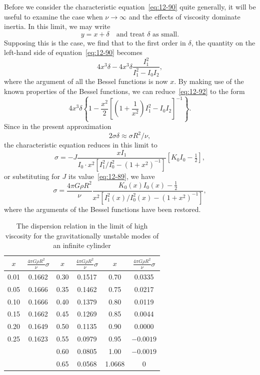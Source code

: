 Before we consider the characteristic equation~\eqref{eq:12-90} quite generally, it will be useful to examine the case when $\nu \to \infty$ and the effects of viscosity dominate inertia. In this limit, we may write
\begin{equation}
\label{eq:12-91}
y = x + \delta \quad \text{and treat } \delta \text{ as small.}
\end{equation}
Supposing this is the case, we find that to the first order in $\delta$, the quantity on the left-hand side of equation~\eqref{eq:12-90} becomes
\begin{equation}
\label{eq:12-92}
4x^3\delta - 4x^3\delta\frac{I_1^2}{I_1^2 - I_0 I_2},
\end{equation}
where the argument of all the Bessel functions is now $x$. By making use of the known properties of the Bessel functions, we can reduce~\eqref{eq:12-92} to the form
\begin{equation}
\label{eq:12-93}
4x^3\delta \left\{1 - \frac{x^2}{2}\left[\left(1 + \frac{1}{x^2}\right)I_1^2 - I_0 I_2\right]^{-1}\right\}.
\end{equation}
Since in the present approximation
\begin{equation}
\label{eq:12-94}
2\sigma\delta \approx \sigma R^2/\nu,
\end{equation}
the characteristic equation reduces in this limit to
\begin{equation}
\label{eq:12-95}
\sigma = -J \frac{x I_1}{I_0 \cdot x^2 [I_1^2/I_0^2-(1+x^2)^{-1}]} [K_0 I_0 - \tfrac{1}{2}],
\end{equation}
or substituting for $J$ its value~\eqref{eq:12-89}, we have
\begin{equation}
\label{eq:12-96}
\sigma = \frac{4\pi G\rho R^2}{\nu} \frac{K_0(x)I_0(x)-\frac{1}{2}}{x^2[I_1^2(x)/I_0^2(x)-(1+x^2)^{-1}]},
\end{equation}
where the arguments of the Bessel functions have been restored.

\begin{table}[ht]
\centering
\caption{The dispersion relation in the limit of high viscosity for the gravitationally unstable modes of an infinite cylinder}
\label{tab:LIV}
\begin{tabular}{cccccc}
\hline
$x$ & $\frac{4\pi G\rho R^2}{\nu}\sigma$ & $x$ & $\frac{4\pi G\rho R^2}{\nu}\sigma$ & $x$ & $\frac{4\pi G\rho R^2}{\nu}\sigma$ \\
\hline
0.01 & 0.1662 & 0.30 & 0.1517 & 0.70 & 0.0335 \\
0.05 & 0.1666 & 0.35 & 0.1462 & 0.75 & 0.0217 \\
0.10 & 0.1666 & 0.40 & 0.1379 & 0.80 & 0.0119 \\
0.15 & 0.1662 & 0.45 & 0.1269 & 0.85 & 0.0044 \\
0.20 & 0.1649 & 0.50 & 0.1135 & 0.90 & 0.0000 \\
0.25 & 0.1623 & 0.55 & 0.0979 & 0.95 & $-0.0019$ \\
& & 0.60 & 0.0805 & 1.00 & $-0.0019$ \\
& & 0.65 & 0.0568 & 1.0668 & 0 \\
\hline
\end{tabular}
\end{table}

